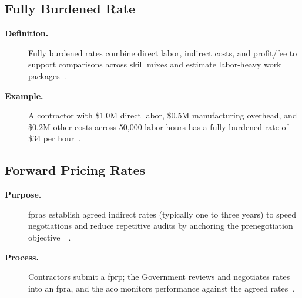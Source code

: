 \documentclass[../main.tex]{subfiles}
\begin{document}
\subsection{Fully Burdened Rate}
\begin{description}
  \item[\textbf{Definition.}] Fully burdened rates combine direct labor, indirect costs, and profit/fee to support comparisons across skill mixes and estimate labor-heavy work packages~\autocite{edo-3-2-4-cost-price-evaluation-2025}.
  \item[\textbf{Example.}] A contractor with \$1.0M direct labor, \$0.5M manufacturing overhead, and \$0.2M other costs across 50,000 labor hours has a fully burdened rate of \$34 per hour~\autocite{edo-3-2-4-cost-price-evaluation-2025}.
\end{description}

\subsection{Forward Pricing Rates}
\begin{description}
  \item[\textbf{Purpose.}] \acp{fpra} establish agreed indirect rates (typically one to three years) to speed negotiations and reduce repetitive audits by anchoring the prenegotiation objective~\autocite[\S~15.407-3]{FAR}~\autocite{edo-3-2-4-cost-price-evaluation-2025}.
  \item[\textbf{Process.}] Contractors submit a \ac{fprp}; the Government reviews and negotiates rates into an \ac{fpra}, and the \ac{aco} monitors performance against the agreed rates~\autocite{edo-3-2-4-cost-price-evaluation-2025}.
\end{description}
\end{document}

